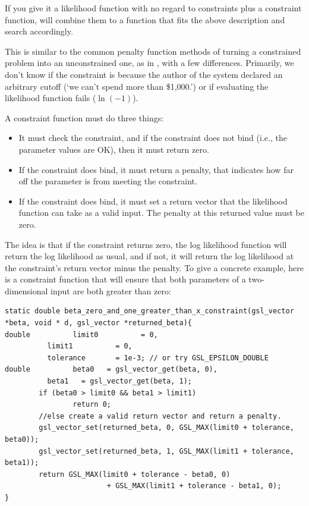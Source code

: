 If you give it a likelihood function with no regard to constraints plus
a constraint function,  will combine
them to a function that fits the above description and search accordingly.

This is similar to the common penalty function methods of turning a
constrained problem into an unconstrained one, as in \citet{avriel:nonlinear},
with a few differences. Primarily, we don't know if the constraint is
because the author of the system declared an arbitrary cutoff (`we can't spend more
than \$1,000.') or if evaluating the likelihood function fails
($\ln(-1)$). 

A constraint function must do three things:
\begin{itemize}
\item It must check the constraint, and if the constraint does not bind (i.e., the parameter values are OK), then it must return zero.
\item If the constraint does bind, it must return a penalty, that indicates how far off the parameter is from meeting the constraint.
\item If the constraint does bind, it must set a return vector that the likelihood function can take as a valid input. The penalty at this returned value must be zero.
\end{itemize}

The idea is that if the constraint returns zero, the log likelihood
function will return the log likelihood as usual, and if not, it will
return the log likelihood at the constraint's return vector minus the
penalty. To give a concrete example, here is a constraint function that
will ensure that both parameters of a two-dimensional input are both
greater than zero:

\begin{lstlisting}
static double beta_zero_and_one_greater_than_x_constraint(gsl_vector *beta, void * d, gsl_vector *returned_beta){
double          limit0          = 0,
          limit1          = 0,
          tolerance       = 1e-3; // or try GSL_EPSILON_DOUBLE
double          beta0   = gsl_vector_get(beta, 0),
          beta1   = gsl_vector_get(beta, 1);
        if (beta0 > limit0 && beta1 > limit1)
                return 0;
        //else create a valid return vector and return a penalty.
        gsl_vector_set(returned_beta, 0, GSL_MAX(limit0 + tolerance, beta0)); 
        gsl_vector_set(returned_beta, 1, GSL_MAX(limit1 + tolerance, beta1));
        return GSL_MAX(limit0 + tolerance - beta0, 0) 
                        + GSL_MAX(limit1 + tolerance - beta1, 0); 
}
\end{lstlisting}

